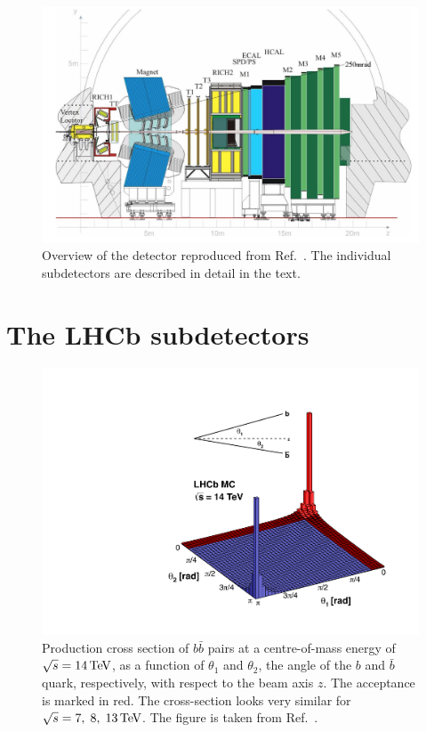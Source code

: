 \begin{figure}[tb]
    \centering
    \includegraphics[width=\columnwidth]{figures/detector/LHCb_detector.png}
    \caption{Overview of the \lhcb detector reproduced from Ref.~\cite{LHCb-detector}. The individual subdetectors are described in detail in the text.}
    \label{fig:lhcb_detector}
\end{figure}



\section{The LHCb subdetectors} %
\label{sec:subdetectors}

\begin{figure}[tbp]
    \centering
    \includegraphics[width=0.8\columnwidth]{figures/detector/bbangles.pdf}
    \caption{Production cross section of $b\bar b$ pairs at a centre-of-mass energy of $\sqrt s = 14\text{\,Te\kern -0.1em V}$, as a function of $\theta_1$ and $\theta_2$, the angle of the $b$ and $\bar b$ quark, respectively, with respect to the beam axis $z$. The \lhcb acceptance is marked in red. The cross-section looks very similar for $\sqrt s = 7,\; 8,\; 13\text{\,Te\kern -0.1em V}$. The figure is taken from Ref.~\cite{bbangles}.}
    \label{fig:bb_angles}
\end{figure}

